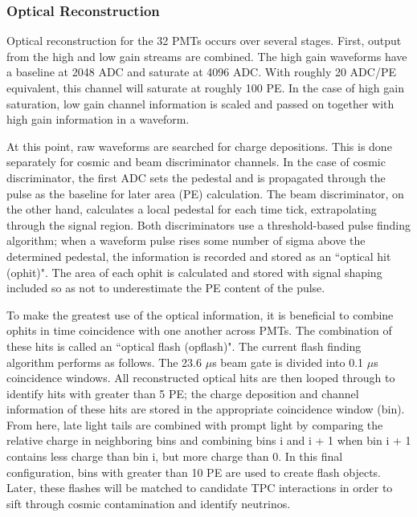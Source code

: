 \subsubsection{Optical Reconstruction} 
Optical reconstruction for the 32 PMTs occurs over several stages. First, output from the high and low gain streams are combined.  The high gain waveforms have a baseline at 2048 ADC and saturate at 4096 ADC.  With roughly 20 ADC/PE equivalent, this channel will saturate at roughly 100 PE.  In the case of high gain saturation, low gain channel information is scaled and passed on together with high gain information in a waveform. 


\par At this point, raw waveforms are searched for charge depositions.  This is done separately for cosmic and beam discriminator channels. In the case of cosmic discriminator, the first ADC sets the pedestal and is propagated through the pulse as the baseline for later area (PE) calculation. The beam discriminator, on the other hand, calculates a local pedestal for each time tick, extrapolating through the signal region. Both discriminators use a threshold-based pulse finding algorithm; when a waveform pulse rises some number of sigma above the determined pedestal, the information is recorded and stored as an ``optical hit (ophit)".  The area of each ophit is calculated and stored with signal shaping included so as not to underestimate the PE content of the pulse.
\par To make the greatest use of the optical information, it is beneficial to combine ophits in time coincidence with one another across PMTs.  The combination of these hits is called an ``optical flash (opflash)".  The current flash finding algorithm performs as follows. The 23.6 $\mu$s beam gate is divided into 0.1 $\mu$s coincidence windows. All reconstructed optical hits are then looped through to identify hits with greater than 5 PE; the charge deposition and channel information of these hits are stored in the appropriate coincidence window (bin).  From here, late light tails are combined with prompt light by comparing the relative charge in neighboring bins and combining bins i and i + 1 when bin i + 1 contains less charge than bin i, but more charge than 0.  In this final configuration, bins with greater than 10 PE are used to create flash objects.  Later, these flashes will be matched to candidate TPC interactions in order to sift through cosmic contamination and identify neutrinos. 

